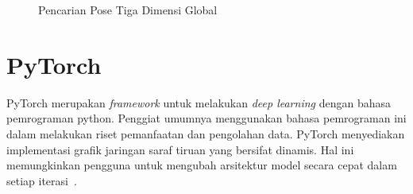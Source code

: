 \begin{figure}[htbp]
    \begin{center}
    \end{center}
    \vspace{-20pt}
    \captionsetup{labelfont=bf, textfont=bf}
    \caption{Pencarian Pose Tiga Dimensi Global}
    \vspace{-10pt}
    \captionsetup{labelfont=md, textfont=md}
    \label{fig:global}
\end{figure}

\section{PyTorch}
\label{sec:2-PyTorch}

PyTorch merupakan \textit{framework} untuk melakukan \textit{deep learning} dengan bahasa pemrograman
python. Penggiat umumnya menggunakan bahasa pemrograman ini dalam melakukan
riset pemanfaatan dan pengolahan data. PyTorch menyediakan implementasi grafik jaringan saraf tiruan yang bersifat dinamis.
Hal ini memungkinkan pengguna untuk mengubah arsitektur model secara cepat dalam setiap iterasi~\cite{2019arXiv191201703P}.

